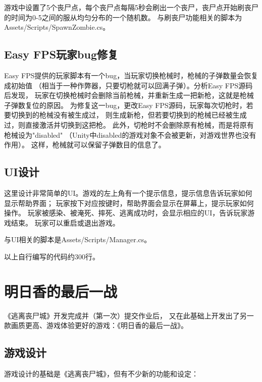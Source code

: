 \documentclass{article}
\begin{document}
游戏中设置了5个丧尸点，每个丧尸点每隔5秒会刷出一个丧尸，丧尸点开始刷丧尸的时间为0-5之间的服从均匀分布的一个随机数。
与刷丧尸功能相关的脚本为Assets/Scripts/SpawnZombie.cs。

\subsection{Easy FPS玩家bug修复}

Easy FPS提供的玩家脚本有一个bug，当玩家切换枪械时，枪械的子弹数量会恢复成初始值
（相当于一种作弊器，只要切枪就可以回满子弹）。分析Easy FPS源码后发现，
玩家在切换枪械时会删除当前枪械，并重新生成一把新枪，这就是枪械子弹数复位的原因。
为修复这一bug，更改Easy FPS源码，玩家每次切枪时，若要切换到的枪械没有被生成过，
则生成新枪，但若要切换到的枪械已经被生成过，则直接激活并切换到这把枪。
此外，切枪时不会删除原有枪械，而是将原有枪械设为"disabled"
（Unity中disabled的游戏对象不会被更新，对游戏世界也没有作用）。
这样，枪械就可以保留子弹数目的信息了。

\subsection{UI设计}

这里设计非常简单的UI。游戏的左上角有一个提示信息，提示信息告诉玩家如何显示帮助界面；
玩家按下对应按键时，帮助界面会显示在屏幕上，提示玩家如何操作。
玩家被感染、被淹死、摔死、逃离成功时，会显示相应的UI，告诉玩家游戏结束。
玩家可以重启或退出游戏。

与UI相关的脚本是Assets/Scripts/Manager.cs。

以上自行编写的代码约300行。

\section{明日香的最后一战}

《逃离丧尸城》开发完成并（第一次）提交作业后，
又在此基础上开发出了另一款画质更高、游戏体验更好的游戏：《明日香的最后一战》。

\subsection{游戏设计}

游戏设计的基础是《逃离丧尸城》，但有不少新的功能和设定：
\end{document}

